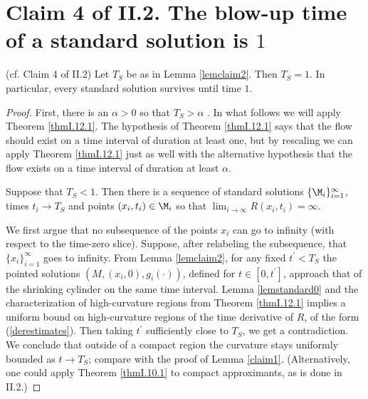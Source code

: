 \section{Claim 4 of II.2.
The blow-up time of a standard solution is $1$}
\label{secclaim4}

\begin{lemma}
  \label{lem:kl-blow-up-time-standard-solution-standard-solutions-lemma}
 (cf. Claim 4 of II.2) \label{lemclaim4}
Let $T_S$ be as in  Lemma \ref{lemclaim2}. Then $T_S=1$.
In particular, every standard solution survives until time $1$.
\end{lemma}
\begin{proof}
First, there is an
$\alpha > 0$
so that $T_S > \alpha$ \cite[Theorem 1.1]{Shi2}.
In what follows we will apply Theorem \ref{thmI.12.1}. The
hypothesis of Theorem \ref{thmI.12.1} says that the flow
should exist on a time interval of duration at least one,
but by
rescaling we can apply Theorem \ref{thmI.12.1} just as well
with the alternative hypothesis that the
flow exists on a time interval of duration
at least $\alpha$.

Suppose that $T_S < 1$.
Then there is a sequence of standard solutions
$\{\M_i\}_{i=1}^\infty$,
times $t_i \rightarrow T_S$ and points $(x_i,t_i)\in \M_i$ so that
$\lim_{i \rightarrow \infty} R(x_i, t_i) = \infty$.

We first
argue that no subsequence of the points $x_i$ can go to infinity (with respect
to the time-zero slice). Suppose, after relabeling the subsequence, that
$\{x_i\}_{i=1}^\infty$ goes to infinity.
From Lemma \ref{lemclaim2},
for any fixed $t^\prime < T_S$ the pointed solutions
$(M,(x_i, 0), g_i(\cdot))$, defined for $t \in [0, t^\prime]$,
approach that of the shrinking cylinder on the same time interval.
Lemma \ref{lemstandard0} and the characterization of high-curvature regions from
Theorem \ref{thmI.12.1} implies a
uniform bound on high-curvature regions of the time derivative of $R$, of the form
(\ref{derestimates}). Then taking $t^\prime$
sufficiently close to $T_S$, we get a contradiction.
We conclude that outside of a compact
region the curvature stays uniformly bounded as $t \rightarrow T_S$;
compare with the proof of Lemma \ref{claim1}.
(Alternatively, one could apply Theorem \ref{thmI.10.1} to compact
approximants, as is done in II.2.)


\end{proof}
